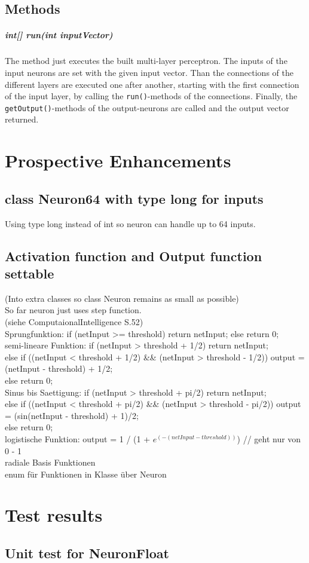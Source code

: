 \section{Methods}
\paragraph{int[] run(int inputVector)}
The method just executes the built multi-layer perceptron. The inputs of the input neurons are set with the given input vector. Than the connections of the different layers are executed one after another, starting with the first connection of the input layer, by calling the \texttt{run()}-methods of the connections. Finally, the \texttt{getOutput()}-methods of the output-neurons are called and the output vector returned.

\chapter{Prospective Enhancements}
\section{class Neuron64 with type long for inputs} %
Using type long instead of int so neuron can handle up to 64 inputs.

\section{Activation function and Output function settable}
(Into extra classes so class Neuron remains as small as possible)\\
So far neuron just uses step function.\\
(siehe ComputaionalIntelligence S.52)\\
Sprungfunktion:	if (netInput >= threshold) return netInput; else return 0;\\
semi-lineare Funktion: if (netInput > threshold + 1/2) return netInput;\\
else if ((netInput < threshold + 1/2) \&\& (netInput > threshold - 1/2)) output = (netInput - threshold) + 1/2;\\
else return 0;\\
Sinus bis Saettigung: if (netInput > threshold + pi/2) return netInput;\\
else if ((netInput < threshold + pi/2) \&\& (netInput > threshold - pi/2)) output = (sin(netInput - threshold) + 1)/2;\\
else return 0;\\
logistische Funktion: output = 1 / (1 + $e^{(-(netInput - threshold))}$) // geht nur von 0 - 1\\
radiale Basis Funktionen\\
enum für Funktionen in Klasse über Neuron

\chapter{Test results}
\section{Unit test for NeuronFloat}